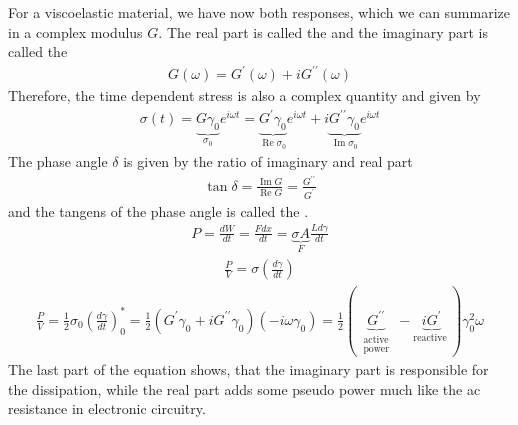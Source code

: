 \documentclass[letterpaper,10pt,english]{sphinxmanual}
\begin{document}
\sphinxAtStartPar
For a viscoelastic material, we have now both responses, which we can summarize in a complex modulus \(G\). The real part is called the  and the imaginary part is called the 
\begin{equation*}
\begin{split}G(\omega)=G^{\prime}(\omega)+i G^{\prime\prime}(\omega)\end{split}
\end{equation*}
\sphinxAtStartPar
Therefore, the time dependent stress is also a complex quantity and given by
\begin{equation*}
\begin{split}\sigma(t)=\underbrace{G \gamma_{0}}_{\sigma_{0}} e^{i \omega t}=\underbrace{G^{\prime} \gamma_{0}}_{\operatorname{Re} \sigma_{0}} e^{i \omega t}+i \underbrace{G^{\prime \prime} \gamma_{0}}_{\operatorname{Im} \sigma_{0}} e^{i \omega t}\end{split}
\end{equation*}
\sphinxAtStartPar
The phase angle \(\delta\) is given by the ratio of imaginary and real part
\begin{equation*}
\begin{split}\tan \delta=\frac{\operatorname{Im} G}{\operatorname{Re} G}=\frac{G^{\prime \prime}}{G^{\prime}}\end{split}
\end{equation*}
\sphinxAtStartPar
and the tangens of the phase angle is called the .
\begin{equation*}
\begin{split}P=\frac{d W}{d t}=\frac{F d x}{d t}=\underbrace{\sigma A}_{F} \frac{L d \gamma}{d t}\end{split}
\end{equation*}\begin{equation*}
\begin{split}\frac{P}{V}=\sigma\left(\frac{d \gamma}{d t}\right)\end{split}
\end{equation*}\begin{equation*}
\begin{split}\frac{P}{V}=\frac{1}{2} \sigma_{0}\left(\frac{d \gamma}{d t}\right)_{0}^{*} = \frac{1}{2}\left(G^{\prime} \gamma_{0}+i G^{\prime \prime} \gamma_{0}\right)\left(-i \omega \gamma_{0}\right) =\frac{1}{2}(\underbrace{G^{\prime \prime}}_{\begin{array}{c}
\text { active } \\
\text { power }
\end{array}}-\underbrace{i G^{\prime}}_{\text {reactive }}) \gamma_{0}^{2} \omega\end{split}
\end{equation*}
\sphinxAtStartPar
The last part of the equation shows, that the imaginary part is responsible for the dissipation, while the real part adds some pseudo power much like the ac resistance in electronic circuitry.
\end{document}
